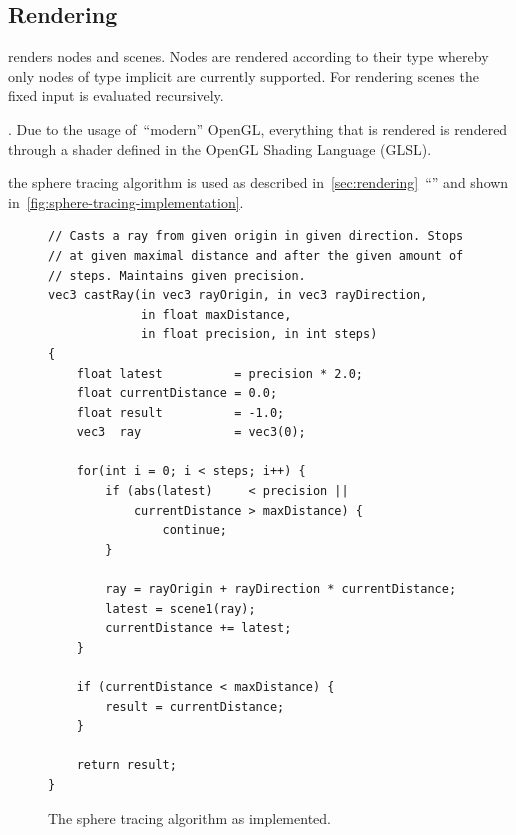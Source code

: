 \documentclass[%
    a4paper,    %
    justified,  %
    nobib,      %
    openany     %
]{tufte-book}
\makeatletter
\renewcommand{\label}[1]{\@tufte@label{##1}}%
\makeatother
\begin{document}
\subsection{Rendering}
\label{results:subsec:program:rendering}

%

 renders nodes and scenes. Nodes are
rendered according to their type whereby only nodes of type implicit are
currently supported. For rendering scenes the fixed input is evaluated
recursively.

. Due to the usage of~\enquote{modern}
OpenGL, everything that is rendered is rendered through a shader defined in the
OpenGL Shading Language (GLSL).

 the sphere tracing algorithm is used as
described in~\cref{sec:rendering}~\enquote{}
and shown in~\cref{fig:sphere-tracing-implementation}.

\begin{figure}
  \begin{verbatim}
// Casts a ray from given origin in given direction. Stops
// at given maximal distance and after the given amount of
// steps. Maintains given precision.
vec3 castRay(in vec3 rayOrigin, in vec3 rayDirection,
             in float maxDistance,
             in float precision, in int steps)
{
    float latest          = precision * 2.0;
    float currentDistance = 0.0;
    float result          = -1.0;
    vec3  ray             = vec3(0);

    for(int i = 0; i < steps; i++) {
        if (abs(latest)     < precision ||
            currentDistance > maxDistance) {
                continue;
        }

        ray = rayOrigin + rayDirection * currentDistance;
        latest = scene1(ray);
        currentDistance += latest;
    }

    if (currentDistance < maxDistance) {
        result = currentDistance;
    }

    return result;
}
  \end{verbatim}
\caption{The sphere tracing algorithm as implemented.}
\label{fig:sphere-tracing-implementation}
\end{figure}
\end{document}
